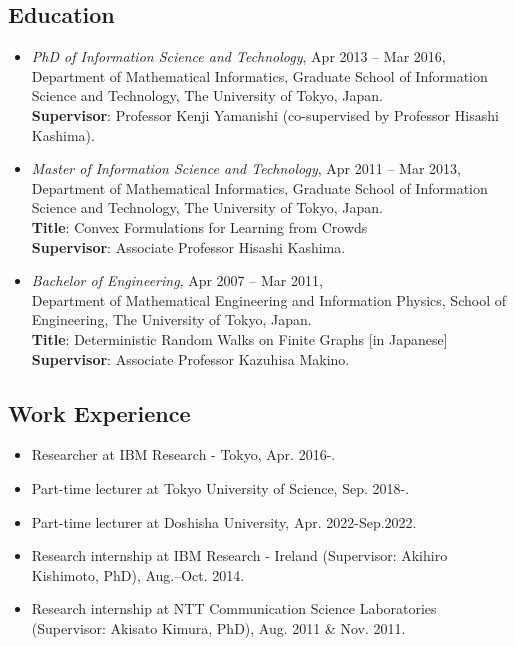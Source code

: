 \documentclass[a4paper,9pt]{article}
\begin{document}
\subsection*{Education}
\begin{itemize}
 \item \textit{PhD of Information Science and Technology}, Apr 2013 -- Mar 2016,\\
Department of Mathematical Informatics, Graduate School of Information Science and Technology, The University of Tokyo, Japan.\\
{\bf Supervisor}: Professor Kenji Yamanishi (co-supervised by Professor Hisashi Kashima).
 \item \textit{Master of Information Science and Technology}, Apr 2011 -- Mar 2013,\\
Department of Mathematical Informatics, Graduate School of Information Science and Technology, The University of Tokyo, Japan.\\
{\bf Title}: Convex Formulations for Learning from Crowds\\
{\bf Supervisor}: Associate Professor Hisashi Kashima.
 \item \textit{Bachelor of Engineering}, Apr 2007 -- Mar 2011, \\
Department of Mathematical Engineering and Information Physics, School of Engineering, The University of Tokyo, Japan.\\
{\bf Title}: Deterministic Random Walks on Finite Graphs [in Japanese]\\
{\bf Supervisor}: Associate Professor Kazuhisa Makino.
\end{itemize}

\subsection*{Work Experience}
\begin{itemize}
 \item Researcher at IBM Research - Tokyo, Apr. 2016-.
 \item Part-time lecturer at Tokyo University of Science, Sep. 2018-.
 \item Part-time lecturer at Doshisha University, Apr. 2022-Sep.2022.
 \item Research internship at IBM Research - Ireland (Supervisor: Akihiro Kishimoto, PhD), Aug.--Oct. 2014.
 \item Research internship at NTT Communication Science Laboratories (Supervisor: Akisato Kimura, PhD), Aug. 2011 \& Nov. 2011.
\end{itemize}
\end{document}
